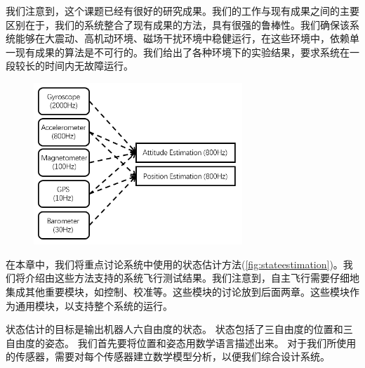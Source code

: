 \documentclass[
  type=master
]{gdutthesis}
\begin{document}
我们注意到，这个课题已经有很好的研究成果\cite{mahony2008nonlinear,hua2010attitude,khosravian2016state}。我们的工作与现有成果之间的主要区别在于，我们的系统整合了现有成果的方法，具有很强的鲁棒性。我们确保该系统能够在大震动、高机动环境、磁场干扰环境中稳健运行，在这些环境中，依赖单一现有成果的算法是不可行的。我们给出了各种环境下的实验结果，要求系统在一段较长的时间内无故障运行。
\begin{figure}[htbp]
	\centering
	\includegraphics[width=0.7\textwidth]{屏幕截图 2022-03-31 170912.png}
	\label{fig:stateestimation}
\end{figure} 

在本章中，我们将重点讨论系统中使用的状态估计方法(\autoref{fig:stateestimation})。我们将介绍由这些方法支持的系统飞行测试结果。我们注意到，自主飞行需要仔细地集成其他重要模块，如控制、校准等。这些模块的讨论放到后面两章。这些模块作为通用模块，以支持整个系统的运行。

状态估计的目标是输出机器人六自由度的状态。
状态包括了三自由度的位置和三自由度的姿态。
我们首先要将位置和姿态用数学语言描述出来。
对于我们所使用的传感器，需要对每个传感器建立数学模型分析，以便我们综合设计系统。
\end{document}
